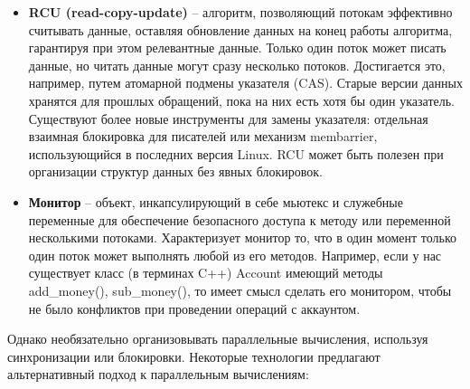 \begin{itemize}
    \item\textbf{RCU (read-copy-update)} -- алгоритм, позволяющий потокам эффективно считывать данные, оставляя обновление данных на конец работы алгоритма, гарантируя при этом релевантные данные. Только один поток может писать данные, но читать данные могут сразу несколько потоков. Достигается это, например, путем атомарной подмены указателя (CAS). Старые версии данных хранятся для прошлых обращений, пока на них есть хотя бы один указатель. Существуют более новые инструменты для замены указателя: отдельная взаимная блокировка для писателей или механизм membarrier, использующийся в последних версия Linux. RCU может быть полезен при организации структур данных без явных блокировок.
    
    \item\textbf{Монитор} -- объект, инкапсулирующий в себе мьютекс и служебные переменные для обеспечение безопасного доступа к методу или переменной несколькими потоками. Характеризует монитор то, что в один момент только один поток может выполнять любой из его методов. Например, если у нас существует класс (в терминах C++) Account имеющий методы add\_money(), sub\_money(), то имеет смысл сделать его монитором, чтобы не было конфликтов при проведении операций с аккаунтом.
\end{itemize}

Однако необязательно организовывать параллельные вычисления, используя синхронизации или блокировки. Некоторые технологии предлагают альтернативный подход к параллельным вычислениям: 

